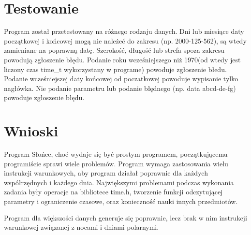 \documentclass[12pt,a4paper]{article}
\begin{document}
\section{Testowanie}
Program został przetestowany na różnego rodzaju danych. Dni lub miesiące daty początkowej i końcowej mogą nie należeć do zakresu (np. 2000-125-562), są wtedy zamieniane na poprawną datę. Szerokość, długość lub strefa spoza zakresu powodują zgłoszenie błędu. Podanie roku wcześniejszego niż 1970(od wtedy jest liczony czas time\_t wykorzystany w programe) powoduje zgłoszenie błedu. Podanie wcześniejszej daty końcowej od poczatkowej powoduje wypisanie tylko nagłówka. Nie podanie parametru lub podanie błędnego (np. data abcd-de-fg) powoduje zgłoszenie błędu. 


\section{Wnioski}


Program Słońce, choć wydaje się być prostym programem, początkującemu programiście sprawi wiele problemów. Program wymaga zastosowania wielu instrukcji warunkowych, aby program działał poprawnie dla każdych współrzędnych i każdego dnia. Największymi problemami podczas wykonania zadania były operacje na bibliotece time.h,  tworzenie funkcji odczytującej parametry i ograniczenie czasowe, oraz konieczność nauki innych przedmiotów.

Program dla większości danych generuje się poprawnie, lecz brak w nim instrukcji warunkowej związanej z nocami i dniami polarnymi.
\end{document}

